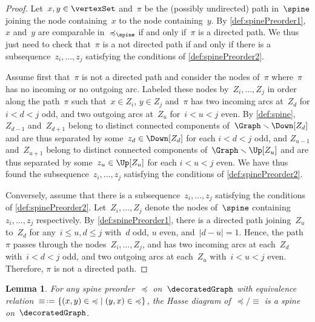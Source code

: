 \documentclass{amsart}
\newtheorem{lemma}[theorem]{Lemma}
\theoremstyle{definition}
\newcommand{\set}[2]{\left\{ #1 \;\middle|\; #2 \right\}} %
\newcommand{\ssm}{\smallsetminus} %
\newcommand{\eqdef}{\mbox{\,\raisebox{0.2ex}{\scriptsize\ensuremath{\mathrm:}}\ensuremath{=}\,}} %
\begin{document}
\begin{proof}
  Let~$x, y \in \vertexSet$ and~$\pi$ be the (possibly undirected) path in~$\spine$ joining the node containing~$x$ to the node containing~$y$.
  By \cref{def:spinePreorder1}, $x$ and~$y$ are comparable in~$\preccurlyeq_{\spine}$ if and only if~$\pi$ is a directed path.
  We thus just need to check that~$\pi$ is a not directed path if and only if there is a subsequence~$z_i, \dots, z_j$ satisfying the conditions of \cref{def:spinePreorder2}.
  
  Assume first that~$\pi$ is not a directed path and consider the nodes of~$\pi$ where~$\pi$ has no incoming or no outgoing arc.
  Labeled these nodes by~$Z_i, \dots, Z_j$ in order along the path~$\pi$ such that~$x \in Z_i$, $y \in Z_j$ and~$\pi$ has two incoming arcs at~$Z_d$ for $i < d < j$ odd, and two outgoing arcs at~$Z_u$ for~$i < u < j$ even.
  By \cref{def:spine}, $Z_{d-1}$ and~$Z_{d+1}$ belong to distinct connected components of~$\Graph \ssm \Down[Z_d]$ and are thus separated by some~$z_d \in \Down[Z_d]$ for each $i < d < j$ odd, and $Z_{u-1}$ and~$Z_{u+1}$ belong to distinct connected components of~$\Graph \ssm \Up[Z_u]$ and are thus separated by some~$z_u \in \Up[Z_u]$ for each $i < u < j$ even.
  We have thus found the subsequence~$z_i, \dots, z_j$ satisfying the conditions of \cref{def:spinePreorder2}.

  Conversely, assume that there is a subsequence~$z_i, \dots, z_j$ satisfying the conditions of \cref{def:spinePreorder2}.
  Let~$Z_i, \dots, Z_j$ denote the nodes of~$\spine$ containing~$z_i, \dots, z_j$ respectively.
  By \cref{def:spinePreorder1}, there is a directed path joining~$Z_u$ to~$Z_d$ for any~$i \le u, d \le j$ with~$d$ odd, $u$ even, and~$|d-u|=1$.
  Hence, the path~$\pi$ passes through the nodes~$Z_i, \dots, Z_j$, and has two incoming arcs at each~$Z_d$ with~$i < d < j$ odd, and two outgoing arcs at each~$Z_u$ with~$i < u < j$ even.
  Therefore, $\pi$ is not a directed path.
\end{proof}

\begin{lemma}
  \label{lem:spinePreorder2}
  For any spine preorder~$\preccurlyeq$ on~$\decoratedGraph$ with equivalence relation~${\equiv} \eqdef \set{(x,y) \in {\preccurlyeq}}{(y,x) \in {\preccurlyeq}}$, the Hasse diagram of~${\preccurlyeq}/{\equiv}$ is a spine on~$\decoratedGraph$.
\end{lemma}
\end{document}
